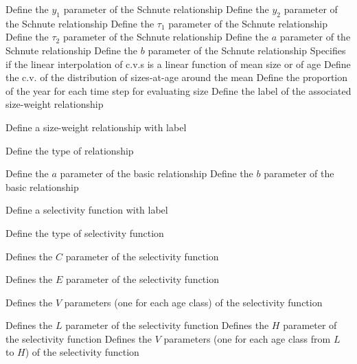 {Define the $y_1$ parameter of the Schnute relationship}
 {Define the $y_2$ parameter of the Schnute relationship}
 {Define the $\tau_1$ parameter of the Schnute relationship}
 {Define the $\tau_2$ parameter of the Schnute relationship}
 {Define the $a$ parameter of the Schnute relationship}
 {Define the $b$ parameter of the Schnute relationship}
 {Specifies if the linear interpolation of c.v.s is a linear function of mean size or of age}
 {Define the c.v. of the distribution of sizes-at-age around the mean}
 {Define the proportion of the year for each time step for evaluating size}
 {Define the label of the associated size-weight relationship}
\par{} {Define a size-weight relationship with label}\par
{} {Define the type of relationship}
\par\textbf{}\par
\par\textbf{}\par
{} {Define the $a$ parameter of the basic relationship}
 {Define the $b$ parameter of the basic relationship}
\par{} {Define a selectivity function with label}\par
{} {Define the type of selectivity function}
\par\textbf{}\par
{} {Defines the $C$ parameter of the selectivity function}
\par\textbf{}\par
{} {Defines the $E$ parameter of the selectivity function}
\par\textbf{}\par
{} {Defines the $V$ parameters (one for each age class) of the selectivity function}
\par\textbf{}\par
{} {Defines the $L$ parameter of the selectivity function}
 {Defines the $H$ parameter of the selectivity function}
 {Defines the $V$ parameters (one for each age class from $L$ to $H$) of the selectivity function}
